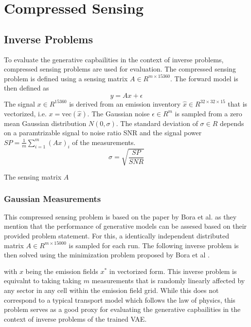 
\chapter{Compressed Sensing}\label{chapter:compressed_sensing}

\section{Inverse Problems}
To evaluate the generative capbailities in the context of inverse problems, compressed sensing problems are used for evaluation.
The compressed sensing problem is defined using a sensing matrix $A \in R^{m \times 15360}$.
The forward model is then defined as
\begin{equation}
    y = A x + \epsilon
\end{equation}
The signal $x \in R^{15360}$ is derived from an emission inventory $\hat{x} \in R^{32 \times 32 \times 15}$ that is vectorized, i.e. $x = \text{vec}(\hat{x})$.
The Gaussian noise $\epsilon \in R^m$ is sampled from a zero mean Gaussian distribution $N(0, \sigma)$.
The standard deviation of $\sigma \in R$ depends on a paramtrizable signal to noise ratio SNR and the signal power $SP = \frac{1}{m}\sum_{i=1}^m{\left(Ax\right)_i}$ of the measurements.
\begin{equation}
    \sigma = \sqrt{\frac{SP}{SNR}}
\end{equation}

The sensing matrix $A$


\subsection{Gaussian Measurements}
This compressed sensing problem is based on the paper by Bora et al. as they mention that the performance of generative models can be assesed based on their provided problem statement.
For this, a identically independent distributed matrix $A \in R^{m \times 15000}$ is sampled for each run.
The following inverse problem is then solved using the minimization problem proposed by Bora et al \parencite{CSUsingAI}.

with $x$ being the emission fields $x^*$ in vectorized form.
This inverse problem is equivalnt to taking taking $m$ measurements that is randomly linearly affected by any sector in any cell within the emission field grid.
While this does not correspond to a typical transport model which follows the law of physics, this problem serves as a good proxy for evaluating the generative capbailities in the context of inverse problems of the trained VAE. 

